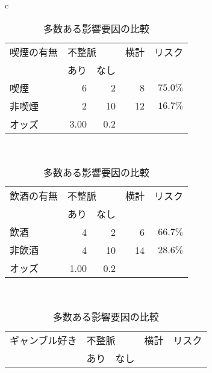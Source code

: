 \documentclass{ltjsarticle}
\begin{document}
\begin{table}[b]
    \caption{多数ある影響要因の比較}
    \label{tbl:score_3}
    \centering
    \begin{tabular}{c}
        \begin{minipage}{0.4\hsize}
            \centering
            \begin{tabular}{l|r|r|r|r} \hline 
                \multicolumn{1}{l}{喫煙の有無} & \multicolumn{2}{|l|}{不整脈} & \multicolumn{1}{l|}{横計} & \multicolumn{1}{l}{リスク}\\ \cline{2-3}
                & あり & なし & & \\ \hline \hline
                喫煙 & 6 & 2 & 8 & $75.0\%$ \\
                非喫煙 & 2 & 10 & 12 & $16.7\%$ \\ \hline 
                オッズ & 3.00 & 0.2 & \multicolumn{2}{|l}{} \\ \hline
            \end{tabular}
        \end{minipage} \\
        \begin{minipage}{0.4\hsize}
            \centering
            \begin{tabular}{l|r|r|r|r} \hline 
                \multicolumn{1}{l}{飲酒の有無} & \multicolumn{2}{|l|}{不整脈} & \multicolumn{1}{l|}{横計} & \multicolumn{1}{l}{リスク}\\ \cline{2-3}
                & あり & なし & & \\ \hline \hline
                飲酒 & 4 & 2 & 6 & $66.7\%$ \\
                非飲酒 & 4 & 10 & 14 & $28.6\%$ \\ \hline 
                オッズ & 1.00 & 0.2 & \multicolumn{2}{|l}{} \\ \hline
            \end{tabular}
        \end{minipage} \\
        \begin{minipage}{0.4\hsize}
            \centering
            \begin{tabular}{l|r|r|r|r} \hline 
                \multicolumn{1}{l}{ギャンブル好き} & \multicolumn{2}{|l|}{不整脈} & \multicolumn{1}{l|}{横計} & \multicolumn{1}{l}{リスク}\\ \cline{2-3}
                & あり & なし & & \\ \hline \hline

\end{tabular}
\end{minipage}
\end{tabular}
\end{table}
\end{document}
